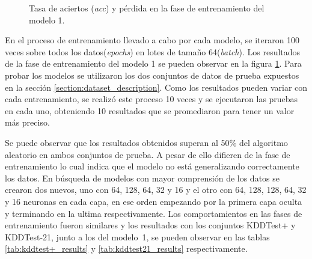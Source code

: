\begin{figure}[!hb]
    \centering

    \caption{Tasa de aciertos (\textit{acc}) y pérdida en la fase de entrenamiento del modelo 1.}
    \label{fig:4x5_train}
\end{figure}

En el proceso de entrenamiento llevado a cabo por cada modelo, se iteraron 100 veces sobre todos los datos(\textit{epochs}) en lotes de tamaño 64(\textit{batch}). Los resultados de la fase de entrenamiento del modelo 1 se pueden observar en la figura \ref{fig:4x5_train}. Para probar los modelos se utilizaron los dos conjuntos de datos de prueba expuestos en la sección \ref{section:dataset_description}. Como los resultados pueden variar con cada entrenamiento, se realizó este proceso 10 veces y se ejecutaron las pruebas en cada uno, obteniendo 10 resultados que se promediaron para tener un valor m\'as preciso.

Se puede observar que los resultados obtenidos superan al 50\% del algoritmo aleatorio en ambos conjuntos de prueba. A pesar de ello difieren de la fase de entrenamiento lo cual indica que el modelo no está generalizando correctamente los datos. En búsqueda de modelos con mayor comprensión de los datos se crearon dos nuevos, uno con 64, 128, 64, 32 y 16 y el otro con 64, 128, 128, 64, 32 y 16 neuronas en cada capa, en ese orden empezando por la primera capa oculta y terminando en la ultima respectivamente. Los comportamientos en las fases de entrenamiento fueron similares y los resultados con los conjuntos KDDTest+ y KDDTest-21, junto a los del modelo~1, se pueden observar en las tablas \ref{tab:kddtest+_results} y \ref{tab:kddtest21_results} respectivamente.


